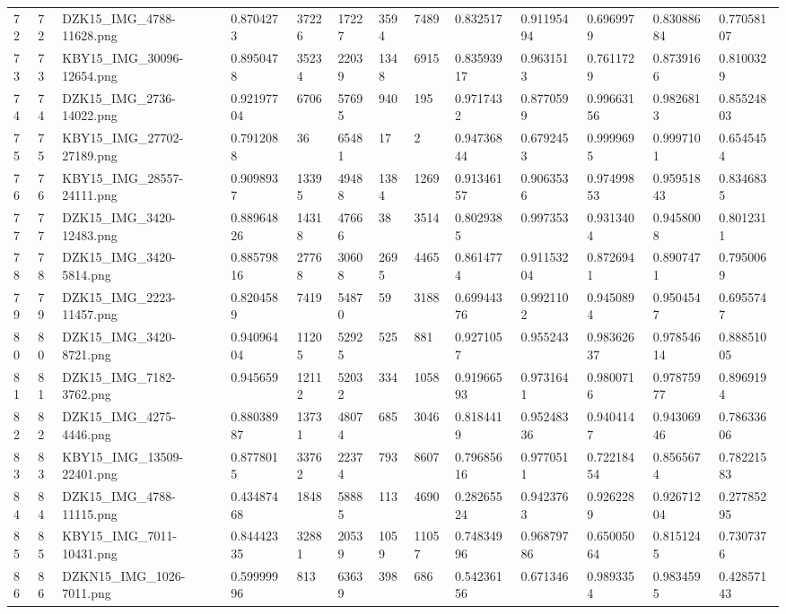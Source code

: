 \documentclass[11pt, a4paper, twoside]{report}
\begin{document}
\begin{longtable}[c]{@{}lllllllllllll@{}}
72 & 72 & DZK15\_IMG\_4788-11628.png & 0.8704273 & 37226 & 17227 & 3594 & 7489 & 0.832517 & 0.91195494 & 0.6969979 & 0.83088684 & 0.77058107 \\
73 & 73 & KBY15\_IMG\_30096-12654.png & 0.8950478 & 35234 & 22039 & 1348 & 6915 & 0.83593917 & 0.9631513 & 0.7611729 & 0.8739166 & 0.8100329 \\
74 & 74 & DZK15\_IMG\_2736-14022.png & 0.92197704 & 6706 & 57695 & 940 & 195 & 0.9717432 & 0.8770599 & 0.99663156 & 0.9826813 & 0.85524803 \\
75 & 75 & KBY15\_IMG\_27702-27189.png & 0.7912088 & 36 & 65481 & 17 & 2 & 0.94736844 & 0.6792453 & 0.9999695 & 0.9997101 & 0.6545454 \\
76 & 76 & KBY15\_IMG\_28557-24111.png & 0.9098937 & 13395 & 49488 & 1384 & 1269 & 0.91346157 & 0.9063536 & 0.97499853 & 0.95951843 & 0.8346835 \\
77 & 77 & DZK15\_IMG\_3420-12483.png & 0.88964826 & 14318 & 47666 & 38 & 3514 & 0.8029385 & 0.997353 & 0.9313404 & 0.9458008 & 0.8012311 \\
78 & 78 & DZK15\_IMG\_3420-5814.png & 0.88579816 & 27768 & 30608 & 2695 & 4465 & 0.8614774 & 0.91153204 & 0.8726941 & 0.8907471 & 0.7950069 \\
79 & 79 & DZK15\_IMG\_2223-11457.png & 0.8204589 & 7419 & 54870 & 59 & 3188 & 0.69944376 & 0.9921102 & 0.9450894 & 0.9504547 & 0.6955747 \\
80 & 80 & DZK15\_IMG\_3420-8721.png & 0.94096404 & 11205 & 52925 & 525 & 881 & 0.9271057 & 0.955243 & 0.98362637 & 0.97854614 & 0.88851005 \\
81 & 81 & DZK15\_IMG\_7182-3762.png & 0.945659 & 12112 & 52032 & 334 & 1058 & 0.91966593 & 0.9731641 & 0.9800716 & 0.97875977 & 0.8969194 \\
82 & 82 & DZK15\_IMG\_4275-4446.png & 0.88038987 & 13731 & 48074 & 685 & 3046 & 0.8184419 & 0.95248336 & 0.9404147 & 0.94306946 & 0.78633606 \\
83 & 83 & KBY15\_IMG\_13509-22401.png & 0.8778015 & 33762 & 22374 & 793 & 8607 & 0.79685616 & 0.9770511 & 0.72218454 & 0.8565674 & 0.78221583 \\
84 & 84 & DZK15\_IMG\_4788-11115.png & 0.43487468 & 1848 & 58885 & 113 & 4690 & 0.28265524 & 0.9423763 & 0.9262289 & 0.92671204 & 0.27785295 \\
85 & 85 & KBY15\_IMG\_7011-10431.png & 0.84442335 & 32881 & 20539 & 1059 & 11057 & 0.74834996 & 0.96879786 & 0.65005064 & 0.8151245 & 0.7307376 \\
86 & 86 & DZKN15\_IMG\_1026-7011.png & 0.59999996 & 813 & 63639 & 398 & 686 & 0.54236156 & 0.671346 & 0.9893354 & 0.9834595 & 0.42857143 \\

\end{longtable}
\end{document}
